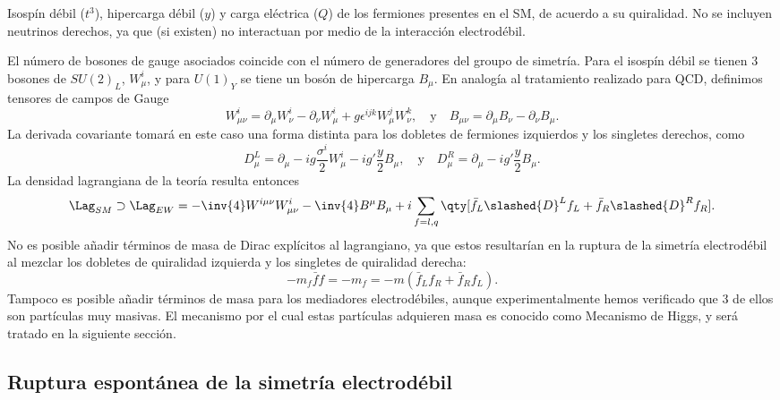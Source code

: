 \begin{margintable}
  \centering
  \setlength{\tabcolsep}{1.5mm}
  \renewcommand{\arraystretch}{1.3}
  
  \caption{Isospín débil ($t^3$), hipercarga débil ($y$) y carga eléctrica ($Q$) de los fermiones presentes en el SM, de acuerdo a su quiralidad. No se incluyen neutrinos derechos, ya que (si existen) no interactuan por medio de la interacción electrodébil.}
  \label{tbl:ch1:SM:EW_isospin-charges}
\end{margintable}

El número de bosones de gauge asociados coincide con el número de generadores del groupo de simetría. Para el isospín débil se tienen 3 bosones de $SU(2)_L$, $W_\mu^i$, y para $U(1)_Y$ se tiene un bosón de hipercarga $B_\mu$. En analogía al tratamiento realizado para QCD, definimos tensores de campos de Gauge
\[
  W^i_{\mu\nu} = \partial_\mu W^i_\nu - \partial_\nu W^i_\mu + g \epsilon^{ijk} W^j_\mu W^k_\nu,
  \quad \text{y} \quad
  B_{\mu\nu} = \partial_\mu B_\nu - \partial_\nu B_\mu.
\]
La derivada covariante tomará en este caso una forma distinta para los dobletes de fermiones izquierdos y los singletes derechos, como
\begin{equation}
  D_\mu^L = \partial_\mu - i g \frac{\sigma^i}{2} W^i_\mu - i g' \frac{y}{2} B_\mu,
  \quad \text{y} \quad
  D_\mu^R = \partial_\mu - i g' \frac{y}{2} B_\mu.
  \label{eq:ch1:SM:EW_covariant_D}
\end{equation}
La densidad lagrangiana de la teoría resulta entonces
\[\Lag_{SM} \supset \Lag_{EW} = -\inv{4} W^{i\mu\nu} W^i_{\mu\nu} - \inv{4} B^\mu B_\mu + i \sum_{f = l, q} \qty[ \bar{f}_L \slashed{D}^L f_L + \bar{f}_R \slashed{D}^R f_R ]. \]
No es posible añadir términos de masa de Dirac explícitos al lagrangiano, ya que estos resultarían en la ruptura de la simetría electrodébil al mezclar los dobletes de quiralidad izquierda y los singletes de quiralidad derecha:
\[ -m_f \bar{f} f = -m_f = -m(\bar{f}_L f_R + \bar{f}_R f_L). \]
Tampoco es posible añadir términos de masa para los mediadores electrodébiles, aunque experimentalmente hemos verificado que 3 de ellos son partículas muy masivas. El mecanismo por el cual estas partículas adquieren masa es conocido como Mecanismo de Higgs, y será tratado en la siguiente sección.







\subsection{Ruptura espontánea de la simetría electrodébil}

